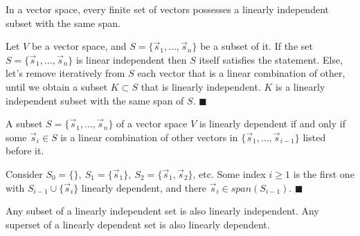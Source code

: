 \begin{tcolorbox}[colback=def_color,colframe=gray,coltext=black] \begin{corollary}
    In a vector space, every finite set of vectors possesses a linearly independent subset with the same span.
\end{corollary}
\end{tcolorbox}

\begin{tcolorbox}[colback=def_color,coltitle=black,coltext=black,colframe=pro_color_back,title=\textbf{Proof}] Let $V$ be a vector space, and $S = \{\vec s_1, \dots, \vec s_n\}$ be a subset of it. If the set $S = \{\vec s_1, \dots, \vec s_n\}$ is linear independent then $S$ itself satisfies the statement. Else, let's remove iteratively from $S$ each vector that is a linear combination of other, until we obtain a subset $K \subset S$ that is linearly independent. $K$ is a linearly independent subset
with the same span of $S$.
$\blacksquare$
\end{tcolorbox}

\begin{tcolorbox}[colback=def_color,colframe=gray,coltext=black] \begin{corollary}
    A subset $S = \{\vec s_1, \dots, \vec s_n\}$ of a vector space $V$ is linearly dependent if and only if some $\vec s_i \in S$ is a linear combination of other vectors in $\{\vec s_1, \dots, \vec s_{i-1}\}$ listed before it.
\end{corollary}
\end{tcolorbox}

\begin{tcolorbox}[colback=def_color,coltitle=black,coltext=black,colframe=pro_color_back,title=\textbf{Proof}] 

Consider $S_0 = \{ \}, \ S_1 = \{\vec s_1 \}, \ S_2 = \{\vec s_1 , \vec s_2 \}$, etc. Some index $i \geq 1$ is the
first one with $S_{i−1} \cup \{\vec s_i \}$ linearly dependent, and there $\vec s_i \in \textit{span}(S_{i−1})$.
$\blacksquare$
\end{tcolorbox}

\begin{tcolorbox}[colback=def_color,colframe=gray,coltext=black] \begin{lemma}
    Any subset of a linearly independent set is also linearly independent.
Any superset of a linearly dependent set is also linearly dependent.
\end{lemma}
\end{tcolorbox}

